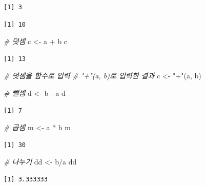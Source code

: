 \documentclass[
  11pt,
]{krantz}
\newenvironment{Shaded}{\begin{snugshade}}{\end{snugshade}}
\newcommand{\CommentTok}[1]{\textcolor[rgb]{0.37,0.37,0.37}{\textit{#1}}}
\newcommand{\NormalTok}[1]{#1}
\newcommand{\OtherTok}[1]{\textcolor[rgb]{0.37,0.37,0.37}{#1}}
\newcommand{\SpecialCharTok}[1]{\textcolor[rgb]{0,0,0}{#1}}
\newcommand{\StringTok}[1]{\textcolor[rgb]{0.5,0.5,0.5}{#1}}
\begin{document}
\begin{verbatim}
[1] 3
\end{verbatim}

\begin{verbatim}
[1] 10
\end{verbatim}

\begin{Shaded}
\begin{Highlighting}[]
\CommentTok{\# 덧셈}
\NormalTok{c }\OtherTok{\textless{}{-}}\NormalTok{ a }\SpecialCharTok{+}\NormalTok{ b}
\NormalTok{c}
\end{Highlighting}
\end{Shaded}

\begin{verbatim}
[1] 13
\end{verbatim}

\begin{Shaded}
\begin{Highlighting}[]
\CommentTok{\# 덧셈을 함수로 입력}
\CommentTok{\# "+"(a, b)로 입력한 결과}
\NormalTok{c }\OtherTok{\textless{}{-}} \StringTok{"+"}\NormalTok{(a, b)}

\CommentTok{\# 뺄셈}
\NormalTok{d }\OtherTok{\textless{}{-}}\NormalTok{ b }\SpecialCharTok{{-}}\NormalTok{ a}
\NormalTok{d}
\end{Highlighting}
\end{Shaded}

\begin{verbatim}
[1] 7
\end{verbatim}

\begin{Shaded}
\begin{Highlighting}[]
\CommentTok{\# 곱셈}
\NormalTok{m }\OtherTok{\textless{}{-}}\NormalTok{ a }\SpecialCharTok{*}\NormalTok{ b}
\NormalTok{m}
\end{Highlighting}
\end{Shaded}

\begin{verbatim}
[1] 30
\end{verbatim}

\begin{Shaded}
\begin{Highlighting}[]
\CommentTok{\# 나누기}
\NormalTok{dd }\OtherTok{\textless{}{-}}\NormalTok{ b}\SpecialCharTok{/}\NormalTok{a}
\NormalTok{dd}
\end{Highlighting}
\end{Shaded}

\begin{verbatim}
[1] 3.333333
\end{verbatim}
\end{document}
